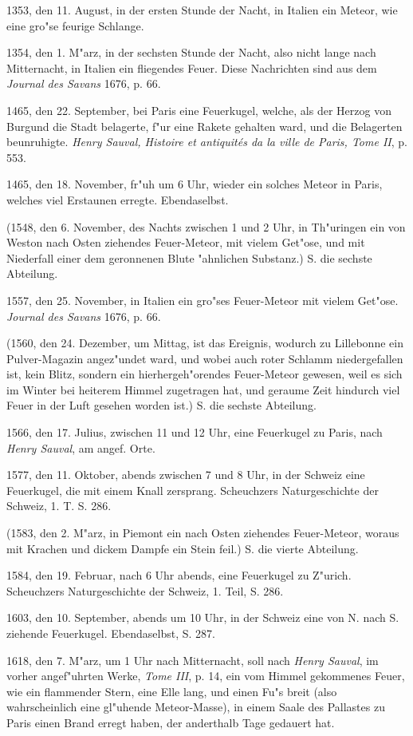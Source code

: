 \documentclass[a4paper, 11pt, oneside, polutonikogreek, german]{article}
\begin{document}
1353, den 11. August, in der ersten Stunde der Nacht, in Italien ein Meteor, wie eine gro"se feurige Schlange.

1354, den 1. M"arz, in der sechsten Stunde der Nacht, also nicht lange nach Mitternacht, in Italien ein fliegendes Feuer. Diese Nachrichten sind aus dem \emph{Journal des Savans} 1676, p. 66.

1465, den 22. September, bei Paris eine Feuerkugel, welche, als der Herzog von Burgund die Stadt belagerte, f"ur eine Rakete gehalten ward, und die Belagerten beunruhigte. \emph{Henry Sauval, Histoire et antiquités da la ville de Paris, Tome II}, p. 553.

1465, den 18. November, fr"uh um 6 Uhr, wieder ein solches Meteor in Paris, welches viel Erstaunen erregte. Ebendaselbst.

(1548, den 6. November, des Nachts zwischen 1 und 2 Uhr, in Th"uringen ein von Weston nach Osten ziehendes Feuer-Meteor, mit vielem Get"ose, und mit Niederfall einer dem geronnenen Blute "ahnlichen Substanz.) S. die sechste Abteilung.

1557, den 25. November, in Italien ein gro"ses Feuer-Meteor mit vielem Get"ose. \emph{Journal des Savans} 1676, p. 66.

(1560, den 24. Dezember, um Mittag, ist das Ereignis, wodurch zu Lillebonne ein Pulver-Magazin angez"undet ward, und wobei auch roter Schlamm niedergefallen ist, kein Blitz, sondern ein hierhergeh"orendes Feuer-Meteor gewesen, weil es sich im Winter bei heiterem Himmel zugetragen hat, und geraume Zeit hindurch viel Feuer in der Luft gesehen worden ist.) S. die sechste Abteilung.

1566, den 17. Julius, zwischen 11 und 12 Uhr, eine Feuerkugel zu Paris, nach \emph{Henry Sauval}, am angef. Orte.

1577, den 11. Oktober, abends zwischen 7 und 8 Uhr, in der Schweiz eine Feuerkugel, die mit einem Knall zersprang. Scheuchzers Naturgeschichte der Schweiz, 1. T. S. 286.

(1583, den 2. M"arz, in Piemont ein nach Osten ziehendes Feuer-Meteor, woraus mit Krachen und dickem Dampfe ein Stein feil.) S. die vierte Abteilung.

1584, den 19. Februar, nach 6 Uhr abends, eine Feuerkugel zu Z"urich. Scheuchzers Naturgeschichte der Schweiz, 1. Teil, S. 286.

1603, den 10. September, abends um 10 Uhr, in der Schweiz eine von N. nach S. ziehende Feuerkugel. Ebendaselbst, S. 287.

1618, den 7. M"arz, um 1 Uhr nach Mitternacht, soll nach \emph{Henry Sauval}, im vorher angef"uhrten Werke, \emph{Tome III}, p. 14, ein vom Himmel gekommenes Feuer, wie ein flammender Stern, eine Elle lang, und einen Fu"s breit (also wahrscheinlich eine gl"uhende Meteor-Masse), in einem Saale des Pallastes zu Paris einen Brand erregt haben, der anderthalb Tage gedauert hat.
\end{document}
